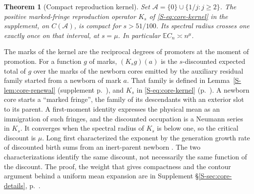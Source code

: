 \documentclass[11pt]{article}
\newtheorem{theorem}{Theorem}
\newcommand{\resulttag}{?}
\newcommand{\tagnext}[1]{\renewcommand{\resulttag}{#1}}
\theoremstyle{remark}
\newcommand{\Sref}[1]{Supplement \S\ref{S-#1}, p.~\pageref{S-#1}}
\begin{document}
\tagnext{KER}
\begin{theorem}[Compact reproduction kernel]\label{th:core-kernel}
Set $\mathcal A=\{0\}\cup\{1/j:j\ge2\}$. The positive marked-fringe reproduction operator $K_s$ of \eqref{S-eq:core-kernel} in the supplement, on $C(\mathcal A)$, is compact for $s>51/100$. Its spectral radius crosses one exactly once on that interval, at $s=\mu$. In particular $\mathbb E C_n\asymp n^\mu$.
\end{theorem}
The marks of the kernel are the reciprocal degrees of promoters at the moment of promotion. For a function $g$ of marks, $(K_sg)(a)$ is the $s$-discounted expected total of $g$ over the marks of the newborn cores emitted by the auxiliary residual family started from a newborn of mark $a$. That family is defined in Lemma~\ref{S-lem:core-renewal} (supplement p.~\pageref{S-lem:core-renewal}), and $K_s$ in \eqref{S-eq:core-kernel} (p.~\pageref{S-eq:core-kernel}). A newborn core starts a ``marked fringe'', the family of its descendants with an exterior slot to its parent. A first-moment identity expresses the physical mean as an immigration of such fringes, and the discounted occupation is a Neumann series in $K_s$. It converges when the spectral radius of $K_s$ is below one, so the critical discount is $\mu$. Long first characterized the exponent by the generation growth rate of discounted birth sums from an inert-parent newborn \cite{LongKernel}. The two characterizations identify the same discount, not necessarily the same function of the discount. The proof, the weight that gives compactness and the contour argument behind a uniform mean expansion are in \Sref{sec:core-details}.
\end{document}
